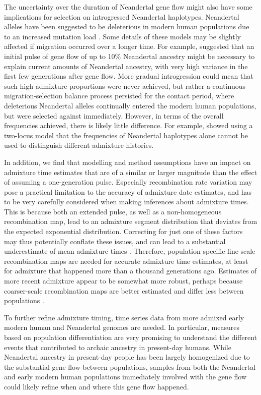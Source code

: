 \documentclass[]{article}
\begin{document}
The uncertainty over the duration of Neandertal gene flow might also have some implications for selection on introgressed Neandertal haplotypes. Neandertal alleles have been suggested to be deleterious in modern human populations due to an increased mutation load \citep{harris_genetic_2016, juric_strength_2016}. Some details of these models may be slightly affected if migration occurred over a longer time. For example, \cite{harris_genetic_2016} suggested that an initial pulse of gene flow of up to 10\% Neandertal ancestry might be necessary to explain current amounts of Neandertal ancestry, with very high variance in the first few generations after gene flow. More gradual introgression could mean that such high admixture proportions were never achieved, but rather a continuous migration-selection balance process persisted for the contact period, where deleterious Neandertal alleles continually entered the modern human populations, but were selected against immediately. 
However, in terms of the overall frequencies achieved, there is likely little difference. For example, \cite{juric_strength_2016} showed using a two-locus model that the frequencies of Neandertal haplotypes alone cannot be used to distinguish different admixture histories.

In addition, we find that modelling and method assumptions have an impact on admixture time estimates that are of a similar or larger magnitude than the effect of assuming a one-generation pulse. Especially recombination rate variation may pose a practical limitation to the accuracy of admixture date estimates, and has to be very carefully considered when making inferences about admixture times. This is because both an extended pulse, as well as a non-homogeneous recombination map, lead to an admixture segment distribution that deviates from the expected exponential distribution. Correcting for just one of these factors may thus potentially conflate these issues, and can lead to a substantial underestimate of mean admixture times \citep{sankararaman_date_2012}. Therefore, population-specific fine-scale recombination maps are needed for accurate admixture time estimates, at least for admixture that happened more than a thousand generations ago. Estimates of more recent admixture appear to be somewhat more robust, perhaps because coarser-scale recombination maps are better estimated and differ less between populations \citep{hinch_landscape_2011}. 


To further refine admixture timing, time series data from more admixed early modern human and Neandertal genomes are  needed. In particular, measures based on population differentiation  \citep[e.g][]{wall_higher_2013,browning_analysis_2018,villanea_multiple_2019} are very promising to understand the different events that contributed to archaic ancestry in present-day humans. While Neandertal ancestry in present-day people has been largely homogenized due to the substantial gene flow between populations, samples from both the Neandertal and early modern human populations immediately involved with the gene flow could likely refine when and where this gene flow happened. 
\end{document}
